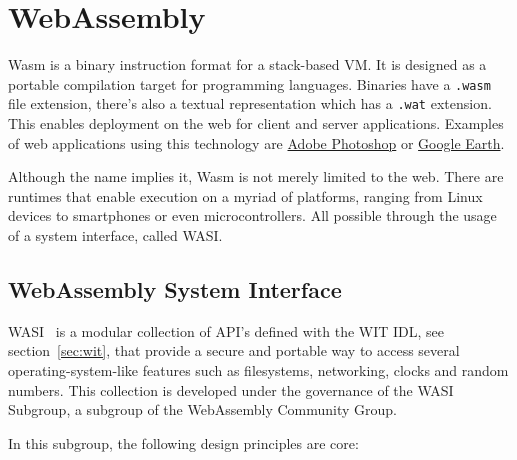 \section{WebAssembly}
\label{chap:wasm}

\gls{Wasm} is a binary instruction format for a stack-based \gls{VM}. It is designed as a portable compilation target for programming languages. Binaries have a \texttt{.wasm} file extension, there's also a textual representation which has a \texttt{.wat} extension. This enables deployment on the web for client and server applications. Examples of web applications using this technology are \href{https://photoshop.adobe.com/}{Adobe Photoshop} or \href{https://earth.google.com/web}{Google Earth}.

Although the name implies it, \gls{Wasm} is not merely limited to the web. There are runtimes that enable execution on a myriad of platforms, ranging from Linux devices to smartphones or even microcontrollers. All possible through the usage of a system interface, called \gls{WASI}.

\subsection{WebAssembly System Interface}
\label{sec:wasi}

\gls{WASI}~\cite{wasi} is a modular collection of \gls{API}'s defined with the \gls{WIT} IDL, see section~\ref{sec:wit}, that provide a secure and portable way to access several operating-system-like features such as filesystems, networking, clocks and random numbers. This collection is developed under the governance of the \gls{WASI} Subgroup, a subgroup of the WebAssembly Community Group.

In this subgroup, the following design principles are core:

